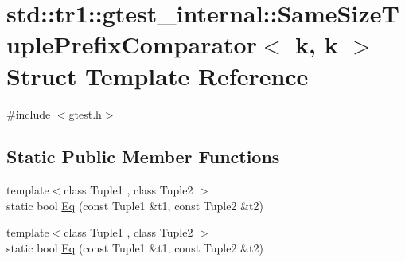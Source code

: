 \hypertarget{structstd_1_1tr1_1_1gtest__internal_1_1_same_size_tuple_prefix_comparator_3_01k_00_01k_01_4}{\section{std\-:\-:tr1\-:\-:gtest\-\_\-internal\-:\-:Same\-Size\-Tuple\-Prefix\-Comparator$<$ k, k $>$ Struct Template Reference}
\label{structstd_1_1tr1_1_1gtest__internal_1_1_same_size_tuple_prefix_comparator_3_01k_00_01k_01_4}
}


{\ttfamily \#include $<$gtest.\-h$>$}

\subsection*{Static Public Member Functions}
\begin{DoxyCompactItemize}
\item 
{\footnotesize template$<$class Tuple1 , class Tuple2 $>$ }\\static bool \hyperlink{structstd_1_1tr1_1_1gtest__internal_1_1_same_size_tuple_prefix_comparator_3_01k_00_01k_01_4_a5564fbade05a2d0522d9899da62c2119}{Eq} (const Tuple1 \&t1, const Tuple2 \&t2)
\item 
{\footnotesize template$<$class Tuple1 , class Tuple2 $>$ }\\static bool \hyperlink{structstd_1_1tr1_1_1gtest__internal_1_1_same_size_tuple_prefix_comparator_3_01k_00_01k_01_4_a5564fbade05a2d0522d9899da62c2119}{Eq} (const Tuple1 \&t1, const Tuple2 \&t2)
\end{DoxyCompactItemize}


